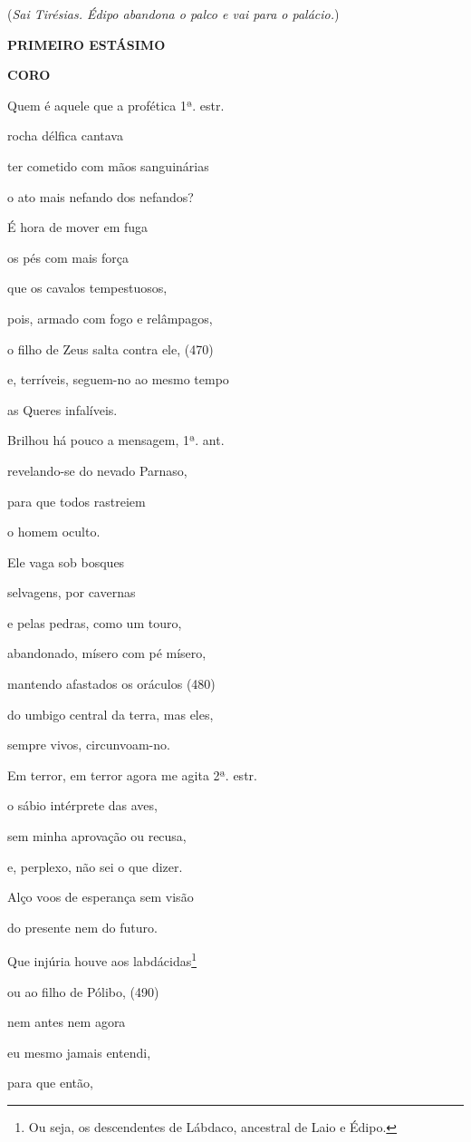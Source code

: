 (\emph{Sai Tirésias. Édipo abandona o palco e vai para o palácio.})

\textbf{PRIMEIRO ESTÁSIMO}

\textbf{CORO}

Quem é aquele que a profética 1ª. estr.

rocha délfica cantava

ter cometido com mãos sanguinárias

o ato mais nefando dos nefandos?

É hora de mover em fuga

os pés com mais força

que os cavalos tempestuosos,

pois, armado com fogo e relâmpagos,

o filho de Zeus salta contra ele, (470)

e, terríveis, seguem-no ao mesmo tempo

as Queres infalíveis.

Brilhou há pouco a mensagem, 1ª. ant.

revelando-se do nevado Parnaso,

para que todos rastreiem

o homem oculto.

Ele vaga sob bosques

selvagens, por cavernas

e pelas pedras, como um touro,

abandonado, mísero com pé mísero,

mantendo afastados os oráculos (480)

do umbigo central da terra, mas eles,

sempre vivos, circunvoam-no.

Em terror, em terror agora me agita 2ª. estr.

o sábio intérprete das aves,

sem minha aprovação ou recusa,

e, perplexo, não sei o que dizer.

Alço voos de esperança sem visão

do presente nem do futuro.

Que injúria houve aos labdácidas\footnote{Ou seja, os descendentes de
  Lábdaco, ancestral de Laio e Édipo.}

ou ao filho de Pólibo, (490)

nem antes nem agora

eu mesmo jamais entendi,

para que então,

